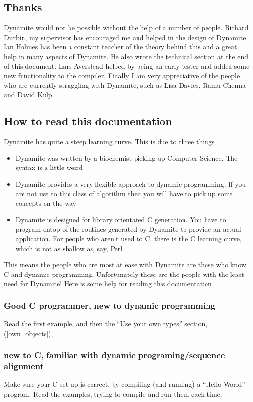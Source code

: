 \subsection{Thanks}
Dynamite would not be possible without the help of a number of people.
Richard Durbin, my supervisor has encouraged me and helped in the design
of Dynamite. Ian Holmes has been a constant teacher of the theory behind
this and a great help in many aspects of Dynamite. He also wrote the technical
section at the end of this document. Lars Averstead helped by being an early
tester and added some new functionality to the compiler. Finally I am very
appreciative of the people who are currently struggling with Dynamite, such
as Lisa Davies, Ramu Chenna and David Kulp.

\subsection{How to read this documentation}

Dynamite has quite a steep learning curve. This is due to three things
\begin{itemize}
\item Dynamite was written by a biochemist picking up Computer Science.
The syntax is a little weird
\item Dynamite provides a very flexible approach to dynamic programming. If
you are not use to this class of algorithm then you will have to pick up
some concepts on the way
\item Dynamite is designed for library orientated C generation. You have to
program ontop of the routines generated by Dynamite to provide an actual
application. For people who aren't used to C, there is the C learning curve,
which is not as shallow as, say, Perl
\end{itemize}

This means the people who are most at ease with Dynamite are those who
know C and dynamic programming. Unfortunately these are the people with the
least need for Dynamite! Here is some help for reading this documentation
\subsubsection{Good C programmer, new to dynamic programming}
Read the first example, and then the ``Use your own types'' section, (\ref{own_objects}),

\subsubsection{new to C, familiar with dynamic programing/sequence alignment}
Make sure your C set up is correct, by compiling (and running) a ``Hello World'' program.
Read the examples, trying to compile and run them each time.

